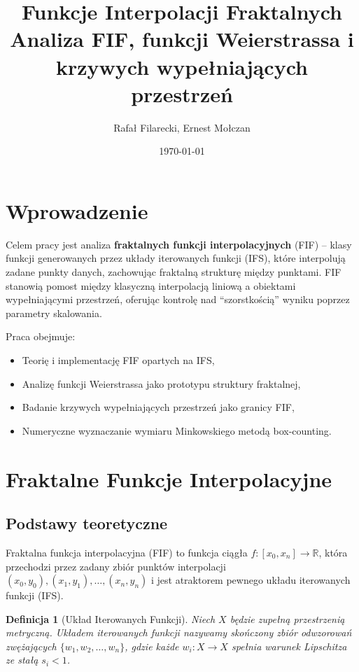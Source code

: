 \documentclass[11pt,a4paper]{article}
\title{\textbf{Funkcje Interpolacji Fraktalnych}\\[0.5em]
\large Analiza FIF, funkcji Weierstrassa i krzywych wypełniających przestrzeń}
\author{Rafał Filarecki, Ernest Mołczan}
\date{\today}
\newtheorem{definition}{Definicja}
\begin{document}
\maketitle

\section{Wprowadzenie}

Celem pracy jest analiza \textbf{fraktalnych funkcji interpolacyjnych} (FIF) -- klasy funkcji generowanych przez układy iterowanych funkcji (IFS), które interpolują zadane punkty danych, zachowując fraktalną strukturę między punktami. FIF stanowią pomost między klasyczną interpolacją liniową a obiektami wypełniającymi przestrzeń, oferując kontrolę nad ``szorstkością'' wyniku poprzez parametry skalowania.

Praca obejmuje:
\begin{itemize}
    \item Teorię i implementację FIF opartych na IFS,
    \item Analizę funkcji Weierstrassa jako prototypu struktury fraktalnej,
    \item Badanie krzywych wypełniających przestrzeń jako granicy FIF,
    \item Numeryczne wyznaczanie wymiaru Minkowskiego metodą box-counting.
\end{itemize}

\section{Fraktalne Funkcje Interpolacyjne}

\subsection{Podstawy teoretyczne}

Fraktalna funkcja interpolacyjna (FIF) to funkcja ciągła $f: [x_0, x_n] \to \mathbb{R}$, która przechodzi przez zadany zbiór punktów interpolacji $(x_0, y_0), (x_1, y_1), \ldots, (x_n, y_n)$ i jest atraktorem pewnego układu iterowanych funkcji (IFS).

\begin{definition}[Układ Iterowanych Funkcji]
Niech $X$ będzie zupełną przestrzenią metryczną. Układem iterowanych funkcji nazywamy skończony zbiór odwzorowań zwężających $\{w_1, w_2, \ldots, w_n\}$, gdzie każde $w_i: X \to X$ spełnia warunek Lipschitza ze stałą $s_i < 1$.
\end{definition}
\end{document}
